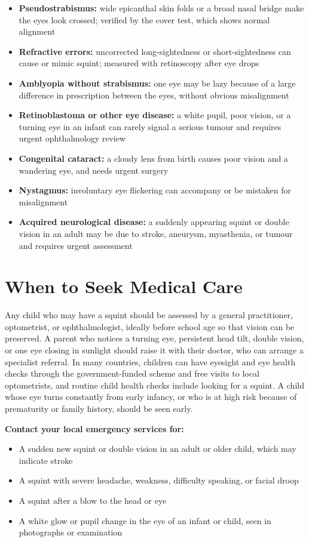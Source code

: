 \begin{itemize}
    \item \textbf{Pseudostrabismus:} wide epicanthal skin folds or a broad nasal bridge make the eyes look crossed; verified by the cover test, which shows normal alignment
    \item \textbf{Refractive errors:} uncorrected long-sightedness or short-sightedness can cause or mimic squint; measured with retinoscopy after eye drops
    \item \textbf{Amblyopia without strabismus:} one eye may be lazy because of a large difference in prescription between the eyes, without obvious misalignment
    \item \textbf{Retinoblastoma or other eye disease:} a white pupil, poor vision, or a turning eye in an infant can rarely signal a serious tumour and requires urgent ophthalmology review
    \item \textbf{Congenital cataract:} a cloudy lens from birth causes poor vision and a wandering eye, and needs urgent surgery
    \item \textbf{Nystagmus:} involuntary eye flickering can accompany or be mistaken for misalignment
    \item \textbf{Acquired neurological disease:} a suddenly appearing squint or double vision in an adult may be due to stroke, aneurysm, myasthenia, or tumour and requires urgent assessment
\end{itemize}

\section*{When to Seek Medical Care}
Any child who may have a squint should be assessed by a general practitioner, optometrist, or ophthalmologist, ideally before school age so that vision can be preserved. A parent who notices a turning eye, persistent head tilt, double vision, or one eye closing in sunlight should raise it with their doctor, who can arrange a specialist referral. In many countries, children can have eyesight and eye health checks through the government-funded scheme and free visits to local optometrists, and routine child health checks include looking for a squint. A child whose eye turns constantly from early infancy, or who is at high risk because of prematurity or family history, should be seen early.

\textbf{Contact your local emergency services for:}
\begin{itemize}
    \item A sudden new squint or double vision in an adult or older child, which may indicate stroke
    \item A squint with severe headache, weakness, difficulty speaking, or facial droop
    \item A squint after a blow to the head or eye
    \item A white glow or pupil change in the eye of an infant or child, seen in photographs or examination
\end{itemize}

